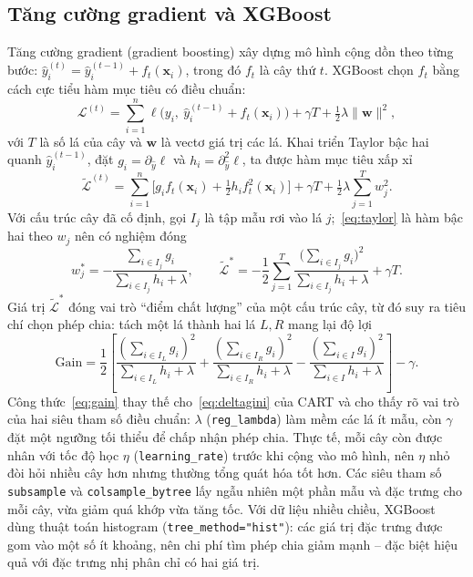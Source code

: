 \documentclass[12pt,a4paper,oneside]{report}
\begin{document}
\subsection{Tăng cường gradient và XGBoost}
Tăng cường gradient (gradient boosting) xây dựng mô hình
cộng dồn theo từng bước:
$\hat{y}^{(t)}_i = \hat{y}^{(t-1)}_i + f_t(\mathbf{x}_i)$, trong đó $f_t$ là
cây thứ $t$. XGBoost \cite{chen2016} chọn $f_t$ bằng cách cực tiểu hàm mục tiêu
có điều chuẩn:
\begin{equation}
  \mathcal{L}^{(t)} = \sum_{i=1}^{n}
  \ell\big(y_i,\ \hat{y}^{(t-1)}_i + f_t(\mathbf{x}_i)\big)
  + \gamma T + \tfrac{1}{2}\lambda \lVert \mathbf{w} \rVert^{2},
  \label{eq:xgb}
\end{equation}
với $T$ là số lá của cây và $\mathbf{w}$ là vectơ giá trị các lá. Khai triển
Taylor bậc hai quanh $\hat{y}^{(t-1)}_i$, đặt
$g_i = \partial_{\hat{y}}\ell$ và $h_i = \partial^{2}_{\hat{y}}\ell$, ta được
hàm mục tiêu xấp xỉ
\begin{equation}
  \tilde{\mathcal{L}}^{(t)} = \sum_{i=1}^{n}
  \Big[ g_i f_t(\mathbf{x}_i) + \tfrac{1}{2} h_i f_t^{2}(\mathbf{x}_i) \Big]
  + \gamma T + \tfrac{1}{2}\lambda \sum_{j=1}^{T} w_j^{2} .
  \label{eq:taylor}
\end{equation}
Với cấu trúc cây đã cố định, gọi $I_j$ là tập mẫu rơi vào lá $j$;~\eqref{eq:taylor}
là hàm bậc hai theo $w_j$ nên có nghiệm đóng
\begin{equation}
  w_j^{*} = -\frac{\sum_{i \in I_j} g_i}{\sum_{i \in I_j} h_i + \lambda},
  \qquad
  \tilde{\mathcal{L}}^{*} = -\frac{1}{2}\sum_{j=1}^{T}
  \frac{\big(\sum_{i \in I_j} g_i\big)^{2}}{\sum_{i \in I_j} h_i + \lambda}
  + \gamma T .
  \label{eq:leaf}
\end{equation}
Giá trị $\tilde{\mathcal{L}}^{*}$ đóng vai trò ``điểm chất lượng'' của một cấu
trúc cây, từ đó suy ra tiêu chí chọn phép chia: tách một lá thành hai lá $L, R$
mang lại độ lợi
\begin{equation}
  \mathrm{Gain} = \frac{1}{2}\left[
  \frac{(\sum_{i \in I_L} g_i)^{2}}{\sum_{i \in I_L} h_i + \lambda}
  + \frac{(\sum_{i \in I_R} g_i)^{2}}{\sum_{i \in I_R} h_i + \lambda}
  - \frac{(\sum_{i \in I} g_i)^{2}}{\sum_{i \in I} h_i + \lambda}
  \right] - \gamma .
  \label{eq:gain}
\end{equation}
Công thức~\eqref{eq:gain} thay thế cho~\eqref{eq:deltagini} của CART và cho thấy
rõ vai trò của hai siêu tham số điều chuẩn: $\lambda$ (\texttt{reg\_lambda}) làm
mềm các lá ít mẫu, còn $\gamma$ đặt một ngưỡng tối thiểu để chấp nhận phép chia.
Thực tế, mỗi cây còn được nhân với tốc độ học $\eta$
(\texttt{learning\_rate}) trước khi cộng vào mô hình, nên $\eta$ nhỏ đòi hỏi
nhiều cây hơn nhưng thường tổng quát hóa tốt hơn. Các siêu tham số
\texttt{subsample} và \texttt{colsample\_bytree} lấy ngẫu nhiên một phần mẫu và
đặc trưng cho mỗi cây, vừa giảm quá khớp vừa tăng tốc. Với dữ liệu nhiều chiều,
XGBoost dùng thuật toán histogram (\texttt{tree\_method="hist"}): các giá
trị đặc trưng được gom vào một số ít khoảng, nên chi phí tìm phép chia giảm
mạnh -- đặc biệt hiệu quả với đặc trưng nhị phân chỉ có hai giá trị.
\end{document}
